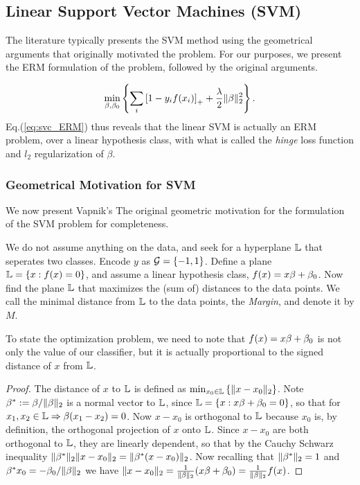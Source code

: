 \subsection{Linear Support Vector Machines (SVM)}
\label{sec:svm}

The literature typically presents the SVM method using the geometrical arguments that originally motivated the problem. 
For our purposes, we present the ERM formulation of the problem, followed by the original arguments.

\begin{align}
\label{eq:svc_ERM}
	\min_{\beta,\beta_0} \left\{ 
		\sum_i \left[ 1-y_i f(x_i) \right]_+ +\frac{\lambda}{2} \Vert \beta \Vert_2^2
	 \right\}.
\end{align}
Eq.(\ref{eq:svc_ERM}) thus reveals that the linear SVM is actually an ERM problem, over a linear hypothesis class, with what is called the \emph{hinge} loss function and $l_2$ regularization of $\beta$.


\subsubsection{Geometrical Motivation for SVM}
We now present Vapnik's The original geometric motivation \citep{vapnik_statistical_1998} for the formulation of the SVM problem for completeness. 

We do not assume anything on the data, and seek for a hyperplane $\mathbb{L}$ that seperates two classes. 
Encode $y$ as $\mathcal{G}=\left\{ -1,1 \right\}$.
Define a plane $\mathbb{L}=\left\{ x: f(x)=0  \right\}$, and assume a linear hypothesis class, $f(x)=x\beta+\beta_0$.
Now find the plane $\mathbb{L}$ that maximizes the (sum of) distances to the data points.
We call the minimal distance from $\mathbb{L}$ to the data points, the \emph{Margin}, and denote it by $M$.

To state the optimization problem, we need to note that $f(x)=x\beta+\beta_0$ is not only the value of our classifier, but it is actually proportional to the signed distance of $x$ from $\mathbb{L}$. 
\begin{proof}
The distance of $x$ to $\mathbb{L}$ is defined as $\min_{x_0 \in \mathbb{L}} \left\{  \Vert x-x_0 \Vert_2  \right\}$.
Note $\beta^*:=\beta/\Vert \beta \Vert_2$ is a normal vector to $\mathbb{L}$, since $\mathbb{L}=\left\{ x: x\beta+\beta_0=0  \right\}$, so that for $x_1,x_2 \in \mathbb{L} \Rightarrow \beta(x_1-x_2)=0$.
Now $x-x_0$ is orthogonal to $\mathbb{L}$ because $x_0$ is, by definition, the orthogonal projection of $x$ onto $\mathbb{L}$.
Since $x-x_0$ are both orthogonal to $\mathbb{L}$, they are linearly dependent, so that by the Cauchy Schwarz inequality $\Vert \beta^* \Vert_2 \Vert x-x_0 \Vert_2= \Vert \beta^*(x-x_0) \Vert_2$.
Now recalling that $\Vert \beta^* \Vert_2=1$ and $\beta^* x_0=-\beta_0/\Vert \beta \Vert_2$ we have $\Vert x-x_0 \Vert_2=\frac{1}{\Vert \beta \Vert_2} (x\beta+\beta_0)= \frac{1}{\Vert \beta \Vert_2} f(x)$.
\end{proof}

